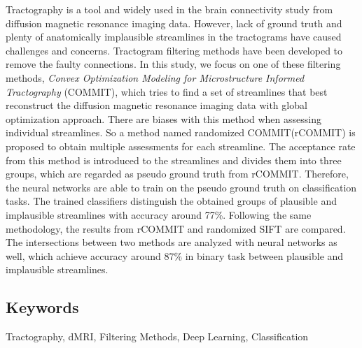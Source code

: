 Tractography is a tool and widely used in the brain connectivity study from
diffusion magnetic resonance imaging data. However, lack of ground truth and plenty of 
anatomically implausible streamlines in the tractograms have caused challenges and concerns.
Tractogram filtering methods have been developed to remove the faulty connections.
In this study, we focus on one of these filtering methods, \textit{Convex Optimization Modeling for Microstructure Informed Tractography} (COMMIT),
which tries to find a set of streamlines that best reconstruct the diffusion magnetic resonance imaging data with global optimization approach.
There are biases with this method when assessing individual streamlines. 
So a method named randomized COMMIT(rCOMMIT) is proposed to obtain multiple assessments for each streamline.
The acceptance rate from this method is introduced to the streamlines and divides them into three groups, which 
are regarded as pseudo ground truth from rCOMMIT. Therefore, the neural networks are able to train on the pseudo ground truth on 
classification tasks. The trained classifiers distinguish the obtained groups of plausible and implausible streamlines with accuracy around 77\%.
Following the same methodology, the results from rCOMMIT and randomized SIFT are compared. 
The intersections between two methods are analyzed with neural networks as well, which achieve accuracy around 87\% in binary task between plausible and implausible streamlines.



\subsection*{Keywords}
Tractography, dMRI, Filtering Methods, Deep Learning, Classification




\newpage
\thispagestyle{plain}
